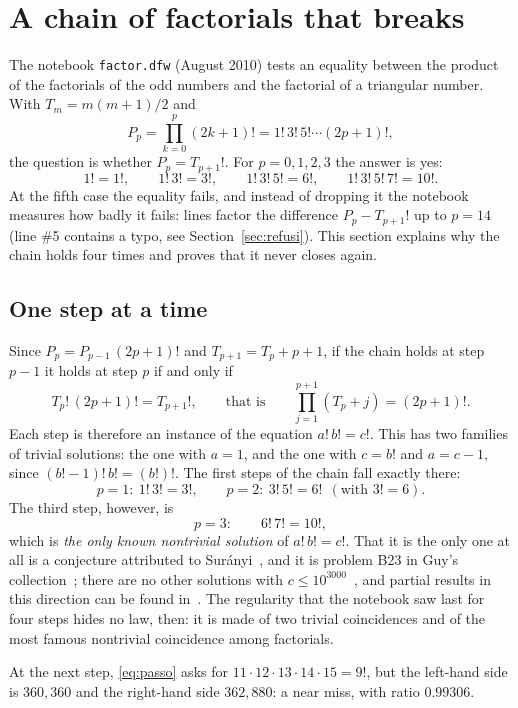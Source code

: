 \section{A chain of factorials that breaks}
\label{sec:fattoriali}

The notebook \texttt{factor.dfw} (August 2010) tests an equality between the
product of the factorials of the odd numbers and the factorial of a
triangular number. With $T_m=m(m+1)/2$ and
\[
  P_p=\prod_{k=0}^{p}(2k+1)!=1!\,3!\,5!\cdots(2p+1)!,
\]
the question is whether $P_p=T_{p+1}!$. For $p=0,1,2,3$ the answer is yes:
\[
  1!=1!,\qquad 1!\,3!=3!,\qquad 1!\,3!\,5!=6!,\qquad 1!\,3!\,5!\,7!=10!.
\]
At the fifth case the equality fails, and instead of dropping it the notebook
measures how badly it fails: lines  factor the
difference $P_p-T_{p+1}!$ up to $p=14$ (line \#5 contains a typo, see
Section~\ref{sec:refusi}). This section explains why the chain holds four
times and proves that it never closes again.

\subsection{One step at a time}

Since $P_p=P_{p-1}\,(2p+1)!$ and $T_{p+1}=T_p+p+1$, if the chain holds at
step $p-1$ it holds at step $p$ if and only if
\begin{equation}\label{eq:passo}
  T_p!\,(2p+1)!=T_{p+1}!,
  \qquad\text{that is}\qquad
  \prod_{j=1}^{p+1}(T_p+j)=(2p+1)!.
\end{equation}
Each step is therefore an instance of the equation $a!\,b!=c!$. This has two
families of trivial solutions: the one with $a=1$, and the one with $c=b!$
and $a=c-1$, since $(b!-1)!\,b!=(b!)!$. The first steps of the chain fall
exactly there:
\[
  p=1:\ 1!\,3!=3!,\qquad
  p=2:\ 3!\,5!=6!\ \ (\text{with }3!=6).
\]
The third step, however, is
\[
  p=3:\qquad 6!\,7!=10!,
\]
which is \emph{the only known nontrivial solution} of $a!\,b!=c!$. That it is
the only one at all is a conjecture attributed to
Sur\'anyi~\cite{erdos373}, and it is problem B23 in Guy's
collection~\cite{guy2004}; there are no other solutions with
$c\le10^{3000}$~\cite{erdos373}, and partial results in this direction can be
found in~\cite{hajdu2018}. The regularity that the notebook saw last for four
steps hides no law, then: it is made of two trivial coincidences and of the
most famous nontrivial coincidence among factorials.

At the next step, \eqref{eq:passo} asks for
$11\cdot12\cdot13\cdot14\cdot15=9!$, but the left-hand side is $360{,}360$
and the right-hand side $362{,}880$: a near miss, with ratio $0.99306$.

